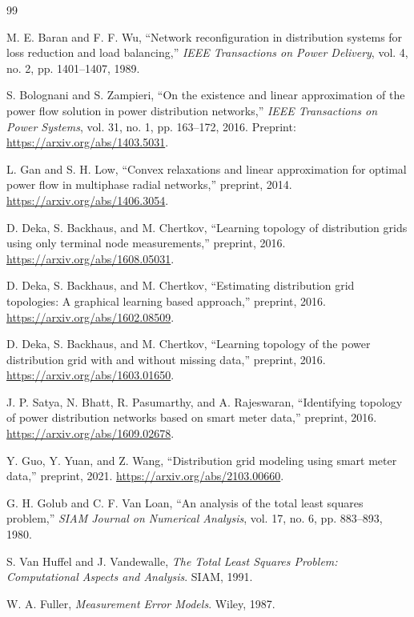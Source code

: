 \documentclass[UTF8,11pt]{ctexart}
\begin{document}
\begin{thebibliography}{99}

M. E. Baran and F. F. Wu,
``Network reconfiguration in distribution systems for loss reduction and load balancing,''
\emph{IEEE Transactions on Power Delivery}, vol. 4, no. 2, pp. 1401--1407, 1989.

S. Bolognani and S. Zampieri,
``On the existence and linear approximation of the power flow solution in power distribution networks,''
\emph{IEEE Transactions on Power Systems}, vol. 31, no. 1, pp. 163--172, 2016.
Preprint: \url{https://arxiv.org/abs/1403.5031}.

L. Gan and S. H. Low,
``Convex relaxations and linear approximation for optimal power flow in multiphase radial networks,''
preprint, 2014. \url{https://arxiv.org/abs/1406.3054}.

D. Deka, S. Backhaus, and M. Chertkov,
``Learning topology of distribution grids using only terminal node measurements,''
preprint, 2016. \url{https://arxiv.org/abs/1608.05031}.

D. Deka, S. Backhaus, and M. Chertkov,
``Estimating distribution grid topologies: A graphical learning based approach,''
preprint, 2016. \url{https://arxiv.org/abs/1602.08509}.

D. Deka, S. Backhaus, and M. Chertkov,
``Learning topology of the power distribution grid with and without missing data,''
preprint, 2016. \url{https://arxiv.org/abs/1603.01650}.

J. P. Satya, N. Bhatt, R. Pasumarthy, and A. Rajeswaran,
``Identifying topology of power distribution networks based on smart meter data,''
preprint, 2016. \url{https://arxiv.org/abs/1609.02678}.

Y. Guo, Y. Yuan, and Z. Wang,
``Distribution grid modeling using smart meter data,''
preprint, 2021. \url{https://arxiv.org/abs/2103.00660}.

G. H. Golub and C. F. Van Loan,
``An analysis of the total least squares problem,''
\emph{SIAM Journal on Numerical Analysis}, vol. 17, no. 6, pp. 883--893, 1980.

S. Van Huffel and J. Vandewalle,
\emph{The Total Least Squares Problem: Computational Aspects and Analysis}.
SIAM, 1991.

W. A. Fuller,
\emph{Measurement Error Models}.
Wiley, 1987.


\end{thebibliography}
\end{document}
